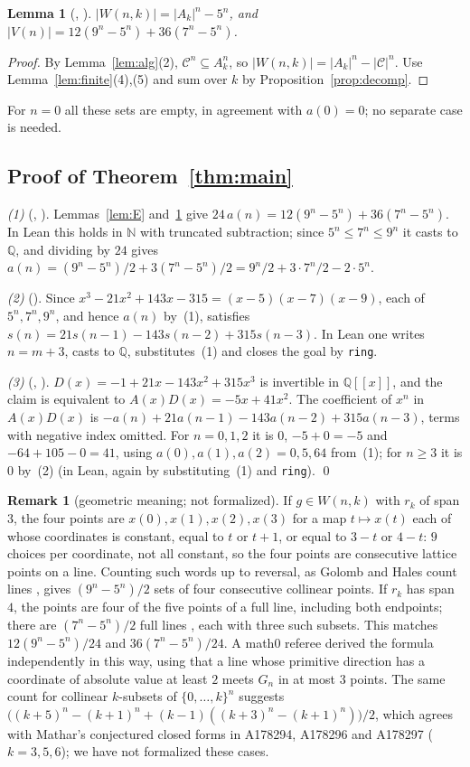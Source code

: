 \documentclass[11pt]{amsart}
\theoremstyle{plain}
\newtheorem{lemma}[theorem]{Lemma}
\theoremstyle{definition}
\newtheorem{remark}[theorem]{Remark}
\newcommand{\N}{\mathbb{N}}
\newcommand{\Q}{\mathbb{Q}}
\newcommand{\cC}{\mathcal{C}}
\begin{document}
\begin{lemma}[, ]\label{lem:count}
$|W(n,k)|=|A_k|^n-5^n$, and $|V(n)|=12(9^n-5^n)+36(7^n-5^n)$.
\end{lemma}

\begin{proof}
By Lemma~\ref{lem:alg}(2), $\cC^n\subseteq A_k^n$, so $|W(n,k)|=|A_k|^n-|\cC|^n$. Use Lemma~\ref{lem:finite}(4),(5) and sum over $k$ by Proposition~\ref{prop:decomp}.
\end{proof}

For $n=0$ all these sets are empty, in agreement with $a(0)=0$; no separate case is needed.

\subsection{Proof of Theorem~\ref{thm:main}}
\emph{(1)} (, ). Lemmas~\ref{lem:E} and~\ref{lem:count} give $24\,a(n)=12(9^n-5^n)+36(7^n-5^n)$. In Lean this holds in $\N$ with truncated subtraction; since $5^n\le7^n\le9^n$ it casts to $\Q$, and dividing by $24$ gives $a(n)=(9^n-5^n)/2+3(7^n-5^n)/2=9^n/2+3\cdot7^n/2-2\cdot5^n$.

\emph{(2)} (). Since $x^3-21x^2+143x-315=(x-5)(x-7)(x-9)$, each of $5^n,7^n,9^n$, and hence $a(n)$ by~(1), satisfies $s(n)=21s(n-1)-143s(n-2)+315s(n-3)$. In Lean one writes $n=m+3$, casts to $\Q$, substitutes~(1) and closes the goal by \texttt{ring}.

\emph{(3)} (, ). $D(x)=-1+21x-143x^2+315x^3$ is invertible in $\Q[[x]]$, and the claim is equivalent to $A(x)D(x)=-5x+41x^2$. The coefficient of $x^n$ in $A(x)D(x)$ is $-a(n)+21a(n-1)-143a(n-2)+315a(n-3)$, terms with negative index omitted. For $n=0,1,2$ it is $0$, $-5+0=-5$ and $-64+105-0=41$, using $a(0),a(1),a(2)=0,5,64$ from~(1); for $n\ge3$ it is $0$ by~(2) (in Lean, again by substituting~(1) and \texttt{ring}). \qed

\begin{remark}[geometric meaning; not formalized]\label{rem:geom}
If $g\in W(n,k)$ with $r_k$ of span $3$, the four points are $x(0),x(1),x(2),x(3)$ for a map $t\mapsto x(t)$ each of whose coordinates is constant, equal to $t$ or $t+1$, or equal to $3-t$ or $4-t$: $9$ choices per coordinate, not all constant, so the four points are consecutive lattice points on a line. Counting such words up to reversal, as Golomb and Hales count lines \cite{GH}, gives $(9^n-5^n)/2$ sets of four consecutive collinear points. If $r_k$ has span $4$, the points are four of the five points of a full line, including both endpoints; there are $(7^n-5^n)/2$ full lines \cite{ES,GH}, each with three such subsets. This matches $12(9^n-5^n)/24$ and $36(7^n-5^n)/24$. A math0 referee derived the formula independently in this way, using that a line whose primitive direction has a coordinate of absolute value at least $2$ meets $G_n$ in at most $3$ points. The same count for collinear $k$-subsets of $\{0,\dots,k\}^n$ suggests $\bigl((k+5)^n-(k+1)^n+(k-1)((k+3)^n-(k+1)^n)\bigr)/2$, which agrees with Mathar's conjectured closed forms in A178294, A178296 and A178297 ($k=3,5,6$); we have not formalized these cases.
\end{remark}
\end{document}
